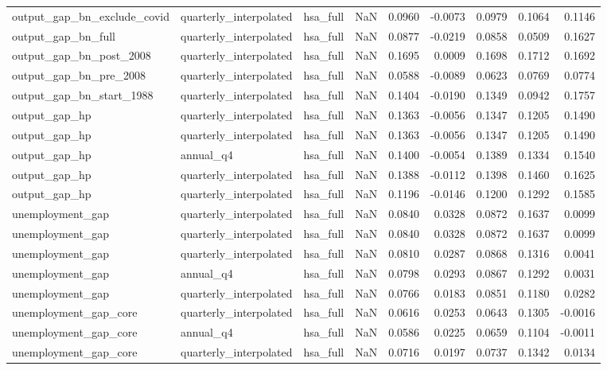 \begin{tabular}{lllrrrrrr}
output\_gap\_bn\_exclude\_covid & quarterly\_interpolated & hsa\_full & NaN & 0.0960 & -0.0073 & 0.0979 & 0.1064 & 0.1146 \\
output\_gap\_bn\_full & quarterly\_interpolated & hsa\_full & NaN & 0.0877 & -0.0219 & 0.0858 & 0.0509 & 0.1627 \\
output\_gap\_bn\_post\_2008 & quarterly\_interpolated & hsa\_full & NaN & 0.1695 & 0.0009 & 0.1698 & 0.1712 & 0.1692 \\
output\_gap\_bn\_pre\_2008 & quarterly\_interpolated & hsa\_full & NaN & 0.0588 & -0.0089 & 0.0623 & 0.0769 & 0.0774 \\
output\_gap\_bn\_start\_1988 & quarterly\_interpolated & hsa\_full & NaN & 0.1404 & -0.0190 & 0.1349 & 0.0942 & 0.1757 \\
output\_gap\_hp & quarterly\_interpolated & hsa\_full & NaN & 0.1363 & -0.0056 & 0.1347 & 0.1205 & 0.1490 \\
output\_gap\_hp & quarterly\_interpolated & hsa\_full & NaN & 0.1363 & -0.0056 & 0.1347 & 0.1205 & 0.1490 \\
output\_gap\_hp & annual\_q4 & hsa\_full & NaN & 0.1400 & -0.0054 & 0.1389 & 0.1334 & 0.1540 \\
output\_gap\_hp & quarterly\_interpolated & hsa\_full & NaN & 0.1388 & -0.0112 & 0.1398 & 0.1460 & 0.1625 \\
output\_gap\_hp & quarterly\_interpolated & hsa\_full & NaN & 0.1196 & -0.0146 & 0.1200 & 0.1292 & 0.1585 \\
unemployment\_gap & quarterly\_interpolated & hsa\_full & NaN & 0.0840 & 0.0328 & 0.0872 & 0.1637 & 0.0099 \\
unemployment\_gap & quarterly\_interpolated & hsa\_full & NaN & 0.0840 & 0.0328 & 0.0872 & 0.1637 & 0.0099 \\
unemployment\_gap & quarterly\_interpolated & hsa\_full & NaN & 0.0810 & 0.0287 & 0.0868 & 0.1316 & 0.0041 \\
unemployment\_gap & annual\_q4 & hsa\_full & NaN & 0.0798 & 0.0293 & 0.0867 & 0.1292 & 0.0031 \\
unemployment\_gap & quarterly\_interpolated & hsa\_full & NaN & 0.0766 & 0.0183 & 0.0851 & 0.1180 & 0.0282 \\
unemployment\_gap\_core & quarterly\_interpolated & hsa\_full & NaN & 0.0616 & 0.0253 & 0.0643 & 0.1305 & -0.0016 \\
unemployment\_gap\_core & annual\_q4 & hsa\_full & NaN & 0.0586 & 0.0225 & 0.0659 & 0.1104 & -0.0011 \\
unemployment\_gap\_core & quarterly\_interpolated & hsa\_full & NaN & 0.0716 & 0.0197 & 0.0737 & 0.1342 & 0.0134 \\

\end{tabular}
